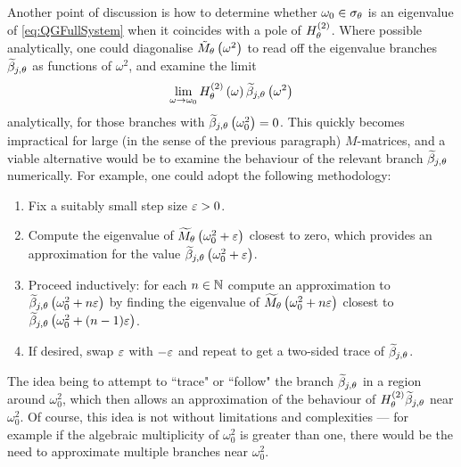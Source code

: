 Another point of discussion is how to determine whether $\omega_0\in\sigma_\theta$ is an eigenvalue of \eqref{eq:QGFullSystem} when it coincides with a pole of $H_\theta^{(2)}$.
Where possible analytically, one could diagonalise $\tilde{M}_\theta\left( \omega^2 \right)$ to read off the eigenvalue branches $\widetilde{\beta}_{j,\theta}$ as functions of $\omega^2$, and examine the limit
\begin{align*}
	\lim_{\omega\rightarrow\omega_0}H_\theta^{(2)}\left( \omega \right)\widetilde{\beta}_{j,\theta}\left( \omega^2 \right)
\end{align*}
analytically, for those branches with $\widetilde{\beta}_{j,\theta}\left( \omega_0^2 \right)=0$.
This quickly becomes impractical for large (in the sense of the previous paragraph) $M$-matrices, and a viable alternative would be to examine the behaviour of the relevant branch $\widetilde{\beta}_{j,\theta}$ numerically.
For example, one could adopt the following methodology:
\begin{enumerate}
	\item Fix a suitably small step size $\varepsilon>0$.
	\item Compute the eigenvalue of $\widetilde{M}_\theta\left( \omega_0^2+\varepsilon \right)$ closest to zero, which provides an approximation for the value $\widetilde{\beta}_{j,\theta}\left( \omega_0^2+\varepsilon \right)$.
	\item Proceed inductively: for each $n\in\mathbb{N}$ compute an approximation to $\widetilde{\beta}_{j,\theta}\left( \omega_0^2+n\varepsilon \right)$ by finding the eigenvalue of $\widetilde{M}_\theta\left( \omega_0^2+n\varepsilon \right)$ closest to $\widetilde{\beta}_{j,\theta}\left( \omega_0^2+(n-1)\varepsilon \right)$.
	\item If desired, swap $\varepsilon$ with $-\varepsilon$ and repeat to get a two-sided trace of $\widetilde{\beta}_{j,\theta}$.
\end{enumerate}
The idea being to attempt to ``trace" or ``follow" the branch $\widetilde{\beta}_{j,\theta}$ in a region around $\omega_0^2$, which then allows an approximation of the behaviour of $H_\theta^{(2)}\widetilde{\beta}_{j,\theta}$ near $\omega_0^2$.
Of course, this idea is not without limitations and complexities --- for example if the algebraic multiplicity of $\omega_0^2$ is greater than one, there would be the need to approximate multiple branches near $\omega_0^2$.

